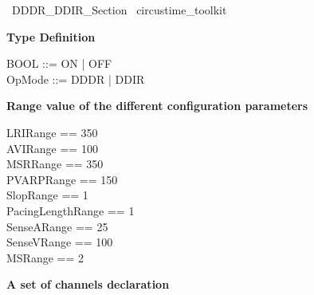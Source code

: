 \begin{zsection}
  \SECTION\ DDDR\_DDIR\_Section \parents\ circustime\_toolkit
\end{zsection}


\hline
\textbf{Type Definition}
\hline

\begin{zed}
  BOOL ::= ON | OFF \\
  OpMode ::= DDDR | DDIR
\end{zed}

\hline
\textbf{Range value of the different configuration parameters}
\hline

\begin{axdef}
  LRIRange == 350 \\            %
  AVIRange == 100 \\             %
  MSRRange == 350 \\            %
  PVARPRange == 150 \\           %
  SlopRange == 1 \\               %
  PacingLengthRange == 1 \\        %
  SenseARange == 25 \\            %
  SenseVRange == 100 \\         %
  MSRange == 2                    %
\end{axdef}


\hline
\textbf{A set of channels declaration }
\hline

